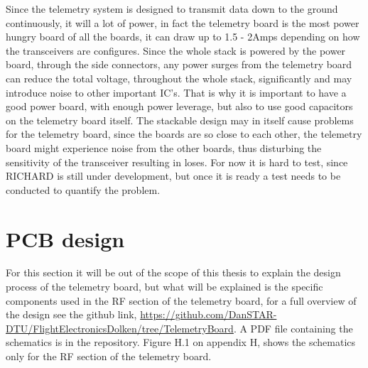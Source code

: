 Since the telemetry system is designed to transmit data down to the ground continuously, it will a lot of power, in fact the telemetry board is the most power hungry board of all the boards, it can draw up to 1.5 - 2Amps depending on how the transceivers are configures. Since the whole stack is powered by the power board, through the side connectors, any power surges from the telemetry board can reduce the total voltage, throughout the whole stack, significantly and may introduce noise to other important IC's. That is why it is important to have a good power board, with enough power leverage, but also to use good capacitors on the telemetry board itself. The stackable design may in itself cause problems for the telemetry board, since the boards are so close to each other, the telemetry board might experience noise from the other boards, thus disturbing the sensitivity of the transceiver resulting in loses. For now it is hard to test, since RICHARD is still under development, but once it is ready a test needs to be conducted to quantify the problem. 
 
\section{PCB design}
For this section it will be out of the scope of this thesis to explain the design process of the telemetry board, but what will be explained is the specific components used in the RF section of the telemetry board, for a full overview of the design see the github link, \url{https://github.com/DanSTAR-DTU/FlightElectronicsDolken/tree/TelemetryBoard}. A PDF file containing the schematics is in the repository. Figure H.1 on appendix H, shows the schematics only for the RF section of the telemetry board. 

